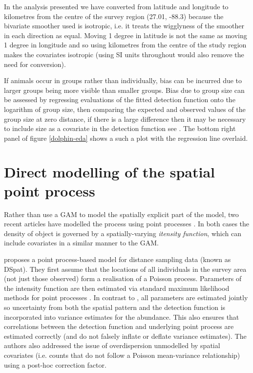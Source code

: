 \documentclass[a4paper,12pt]{article}
\begin{document}
%

In the analysis presented we have converted from latitude and longitude to kilometres from the centre of the survey region (27.01, -88.3) because the bivariate smoother used \citep[the thin plate spline;][]{Wood:2003tc} is isotropic, i.e. it treats the wigglyness of the smoother in each direction as equal. Moving 1 degree in latitude is not the same as moving 1 degree in longitude and so using kilometres from the centre of the study region makes the covariates isotropic (using SI units throughout would also remove the need for conversion).

If animals occur in groups rather than individually, bias can be incurred due to larger groups being more visible than smaller groups. Bias due to group size can be assessed by regressing evaluations of the fitted detection function onto the logarithm of group size, then comparing the expected and observed values of the group size at zero distance, if there is a large difference then it may be necessary to include size as a covariate in the detection function see \citep[see][Section 4.8.2.4]{Buckland:2001vm}. The bottom right panel of figure \ref{dolphin-eda} shows a such a plot with the regression line overlaid.


\section*{Direct modelling of the spatial point process}
\label{s:direct}

Rather than use a GAM to model the spatially explicit part of the model, two recent articles \citep{Johnson:2010gf,Niemi:2010kx} have modelled the process using point processes \citep{cox1980point}. In both cases the density of object is governed by a spatially-varying \textit{itensity function}, which can include covariates in a similar manner to the GAM.

\cite{Johnson:2010gf} proposes a point process-based model for distance sampling data (known as DSpat). They first assume that the locations of all individuals in the survey area (not just those observed) form a realisation of a Poisson process. Parameters of the intensity function are then estimated via standard maximum likelihood methods for point processes \citep{Baddeley:2000to}. In contrast to \cite{Hedley:2004et}, all parameters are estimated jointly so uncertainty from both the spatial pattern and the detection function is incorporated into variance estimates for the abundance. This also ensures that correlations between the detection function and underlying point process are estimated correctly (and do not falsely inflate or deflate variance estimates). The authors also addressed the issue of overdispersion unmodelled by spatial covariates (i.e. counts that do not follow a Poisson mean-variance relationship) using a post-hoc correction factor.
\end{document}
